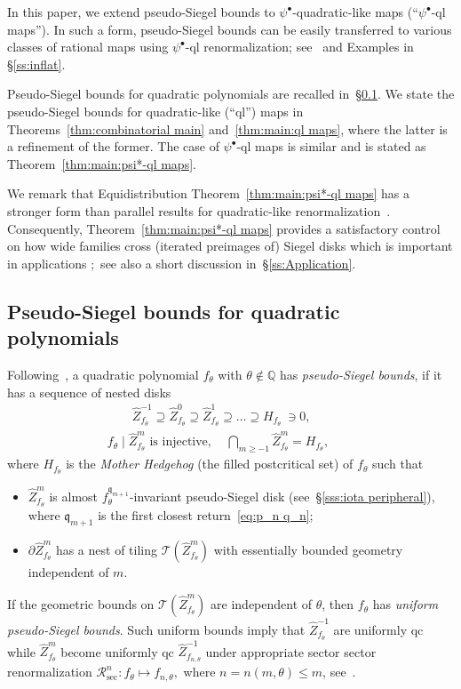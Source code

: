 \documentclass{amsart}
\renewcommand{\sp}{{\ \ }}
\newcommand{\1}{{\mathbb 1 }}
\newcommand\TT{\mathcal{T}}
\newcommand\RR{\mathcal{R}}
\newcommand{\wZ}{{\widehat Z}}
\newcommand{\qq}{\mathfrak{q}}
\newcommand{\Q}{\mathbb{Q}}
\theoremstyle{remark}
\numberwithin{equation}{section}
\theoremstyle{definition}
\renewcommand{\sec}{\mathrm{sec}}
\begin{document}
In this paper, we extend pseudo-Siegel bounds to $\psi^\bullet$-quadratic-like maps  (``$\psi^\bullet$-ql maps'').  In such a form, pseudo-Siegel bounds can be easily transferred to various classes of rational maps using $\psi^\bullet$-ql renormalization; see~\cite{DL:HypComp} and Examples in \S\ref{ss:inflat}. 

Pseudo-Siegel bounds for quadratic polynomials are recalled in~\S\ref{ss:quadr_polynom}. We state the pseudo-Siegel bounds for quadratic-like (``ql'') maps in Theorems~\ref{thm:combinatorial main} and~\ref{thm:main:ql maps}, where the latter is a refinement of the former. The case of $\psi^\bullet$-ql maps is similar and is stated as Theorem~\ref{thm:main:psi*-ql maps}.


We remark that Equidistribution Theorem~\ref{thm:main:psi*-ql maps} has a stronger form than parallel results for quadratic-like renormalization~\cite{K,molecules,DL:Feigen}. Consequently, Theorem~\ref{thm:main:psi*-ql maps} provides a satisfactory control on how wide families cross (iterated preimages of) Siegel disks which is important in applications \cite{DL:HypComp};~see also a short discussion in~\S\ref{ss:Application}.


\subsection{Pseudo-Siegel bounds for quadratic polynomials} \label{ss:quadr_polynom} Following~\cite[Definition 1.4 and~\S11.0.2]{DL22},  a quadratic polynomial $f_\theta$ with $\theta\not\in \Q$ has \emph{pseudo-Siegel bounds}, if it has a sequence of nested disks 
\begin{multline}
\label{eq:dfn:wZ^m:intro}\qquad
\wZ^{-1}_{f_\theta}\supseteq \wZ^{0}_{f_\theta}\supseteq \wZ^1_{f_\theta}\supseteq \dots \supseteq H_{f_\theta}\ \ni 0, \\ f_\theta\mid \wZ^m_{f_\theta} \text{ is injective, }\sp\sp \bigcap_{m\ge -1} \wZ^m_{f_\theta} =H_{f_\theta},\qquad
\end{multline}
where $H_{f_\theta}$ is the \emph{Mother Hedgehog} (the filled postcritical set) of ${f_\theta}$  such that
\begin{itemize}
\item $\wZ^m_{f_\theta}$ is almost $f_\theta^{\qq_{m+1}}$-invariant pseudo-Siegel disk (see~\S\ref{sss:iota peripheral}), where $\qq_{m+1}$ is the first closest return~\eqref{eq:p_n q_n};
\item $\partial \wZ^m_{f_\theta}$ has a nest of tiling $\TT \left(\wZ^m_{f_\theta}\right)$ with essentially bounded geometry independent of $m$.
\end{itemize}
If the geometric bounds on  $\TT \left(\wZ^m_{f_\theta}\right)$ are independent of $\theta$, then $f_\theta$ has \emph{uniform pseudo-Siegel bounds}. Such uniform bounds imply that $\wZ^{-1}_{f_\theta}$ are uniformly qc while $\wZ^{m}_{f_\theta}$ become uniformly qc $\wZ^{-1}_{f_{n,\theta}}$ under appropriate sector sector renormalization $\RR^n_\sec\colon f_{\theta}\mapsto f_{n,\theta},$ where $n=n(m,\theta)\le m$, see~\cite{DL:sector bounds}.
\end{document}
